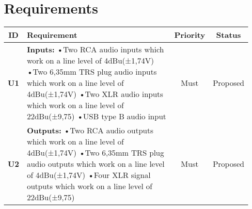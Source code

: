 	\newpage
	\section{Requirements}
	\begin{longtable}{|c|p{10cm}|c|c|}
		\hline
		\textbf{ID} & \textbf{Requirement} & \textbf{Priority} & \textbf{Status}\\ \hline 
		\textbf{U1} & \textbf{Inputs:} \newline
		•Two RCA audio inputs which work on a line level of 4dBu(±1,74V)\newline
		•Two 6,35mm TRS plug audio inputs which work on a line level of 4dBu(±1,74V)\newline
		•Two XLR audio inputs which work on a line level of 22dBu(±9,75)\newline
		•USB type B audio input & Must & Proposed\\ \hline

		\textbf{U2} & \textbf{Outputs:} \newline
		•Two RCA audio outputs which work on a line level of 4dBu(±1,74V)\newline
		•Two 6,35mm TRS plug audio outputs which work on a line level of 4dBu(±1,74V)\newline
		•Four XLR signal outputs which work on a line level of 22dBu(±9,75)
		 & Must & Proposed\\ \hline


\end{longtable}

